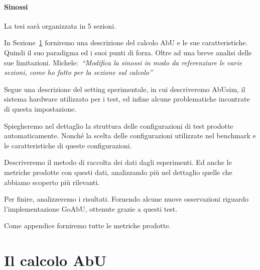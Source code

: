\documentclass[12pt, a4paper]{article}
\newcommand{\michele}[1]{{\color{red}Michele:~}{\itshape``{#1}''}}
\begin{document}
\paragraph{Sinossi}

La tesi sarà organizzata in 5 sezioni.

In Sezione~\ref{sec:calculus} forniremo una descrizione del calcolo AbU e le sue caratteristiche. Quindi il suo paradigma ed i suoi punti di forza. Oltre ad una breve analisi delle sue limitazioni. \michele{Modifica la sinossi in modo da referenziare le varie sezioni, come ho fatto per la sezione sul calcolo}

Segue una descrizione del setting sperimentale, in cui descriveremo AbUsim, il sistema hardware utilizzato per i test, ed infine alcune problematiche incontrate di questa impostazione.

Spiegheremo nel dettaglio la struttura delle configurazioni di test prodotte automaticamente. Nonché la scelta delle configurazioni utilizzate nel benchmark e le caratteristiche di queste configurazioni.

Descriveremo il metodo di raccolta dei dati dagli esperimenti. Ed anche le metriche prodotte con questi dati, analizzando più nel dettaglio quelle che abbiamo scoperto più rilevanti.

Per finire, analizzeremo i risultati. Fornendo alcune nuove osservazioni riguardo l'implementazione GoAbU, ottenute grazie a questi test.

Come appendice forniremo tutte le metriche prodotte.

\section{Il calcolo AbU}\label{sec:calculus}
\end{document}
